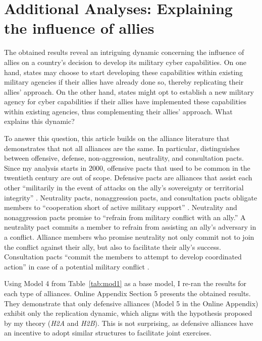 \documentclass[12pt, letterpaper]{article}
\theoremstyle{plain}
\theoremstyle{remark}
\begin{document}
\section*{Additional Analyses: Explaining the influence of allies}

\noindent
The obtained results reveal an intriguing dynamic concerning the influence of allies on a country's decision to develop its military cyber capabilities. On one hand, states may choose to start developing these capabilities within existing military agencies if their allies have already done so, thereby replicating their allies' approach. On the other hand, states might opt to establish a new military agency for cyber capabilities if their allies have implemented these capabilities within existing agencies, thus complementing their allies' approach. What explains this dynamic?


To answer this question, this article builds on the alliance literature that demonstrates that not all alliances are the same. In particular, \citet{leeds2005alliancedataset} distinguishes between offensive, defense, non-aggression, neutrality, and consultation pacts. Since my analysis starts in 2000, offensive pacts that used to be common in the twentieth century are out of scope. Defensive pacts are alliances that assist each other ``militarily in the event of attacks on the ally’s sovereignty or territorial integrity'' \citep[11]{leeds2005alliancedataset}. Neutrality pacts, nonaggression pacts, and consultation pacts obligate members to ``cooperation short of active military support'' \citep[11]{leeds2005alliancedataset}.
Neutrality and nonaggression pacts promise to ``refrain from military conflict with an ally.'' A neutrality pact commits a member to refrain from assisting an ally’s adversary in a conflict. Alliance members who promise neutrality not only commit not to join the conflict against their ally, but also to facilitate their ally’s success. Consultation pacts ``commit the members to attempt to develop coordinated action'' in case of a potential military conflict \citep[11-12]{leeds2005alliancedataset}.


Using Model 4 from Table~\ref{tab:mod1} as a base model, I re-ran the results for each type of alliances. Online Appendix Section 5 %
presents the obtained results. They demonstrate that only defensive alliances (Model 5 in the Online Appendix) exhibit only the replication dynamic, which aligns with the hypothesis proposed by my theory (\textit{H2A} and \textit{H2B}). This is not surprising, as defensive alliances have an incentive to adopt similar structures to facilitate joint exercises. 
\end{document}
